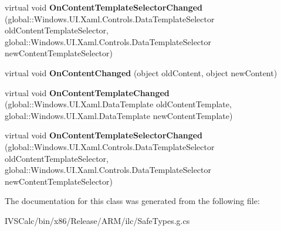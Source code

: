\begin{DoxyCompactItemize}
virtual void {\bfseries On\+Content\+Template\+Selector\+Changed} (global\+::\+Windows.\+U\+I.\+Xaml.\+Controls.\+Data\+Template\+Selector old\+Content\+Template\+Selector, global\+::\+Windows.\+U\+I.\+Xaml.\+Controls.\+Data\+Template\+Selector new\+Content\+Template\+Selector)
\item 
\mbox{\label{class_windows_1_1_u_i_1_1_xaml_1_1_controls_1_1_content_control_ad866ceae79da192e052f451b2a2070a1}} 
virtual void {\bfseries On\+Content\+Changed} (object old\+Content, object new\+Content)
\item 
\mbox{\label{class_windows_1_1_u_i_1_1_xaml_1_1_controls_1_1_content_control_af0e4eade7bb6b73242fbc48c0be8761f}} 
virtual void {\bfseries On\+Content\+Template\+Changed} (global\+::\+Windows.\+U\+I.\+Xaml.\+Data\+Template old\+Content\+Template, global\+::\+Windows.\+U\+I.\+Xaml.\+Data\+Template new\+Content\+Template)
\item 
\mbox{\label{class_windows_1_1_u_i_1_1_xaml_1_1_controls_1_1_content_control_a814a04f46ae960523984ba3c434f195c}} 
virtual void {\bfseries On\+Content\+Template\+Selector\+Changed} (global\+::\+Windows.\+U\+I.\+Xaml.\+Controls.\+Data\+Template\+Selector old\+Content\+Template\+Selector, global\+::\+Windows.\+U\+I.\+Xaml.\+Controls.\+Data\+Template\+Selector new\+Content\+Template\+Selector)
\end{DoxyCompactItemize}


The documentation for this class was generated from the following file\+:\begin{DoxyCompactItemize}
\item 
I\+V\+S\+Calc/bin/x86/\+Release/\+A\+R\+M/ilc/Safe\+Types.\+g.\+cs\end{DoxyCompactItemize}
